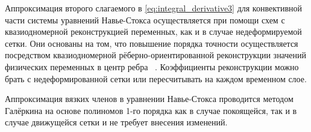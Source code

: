 Аппроксимация второго слагаемого в \eqref{eq:integral_derivative3} для конвективной части системы уравнений Навье-Стокса осуществляется при помощи схем с квазиодномерной реконструкцией переменных, как и в случае недеформируемой сетки. Они основаны на том, что повышение порядка точности осуществляется посредством квазиодномерной рёберно-ориентированной реконструкции значений физических переменных в центр ребра ~\cite{abalakin2016edge}. Коэффициенты реконструкции можно брать с недеформированной сетки или пересчитывать на каждом временном слое. 

Аппроксимация вязких членов в уравнении Навье-Стокса проводится методом Галёркина на основе полиномов 1-го порядка как в случае покоящейся, так и в случае движущейся сетки и не требует внесения изменений. 




